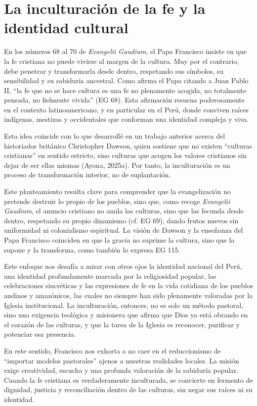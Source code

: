 \documentclass[12pt]{article}
\begin{document}
\section{La inculturación de la fe y la identidad cultural}

En los números 68 al 70 de \textit{Evangelii Gaudium}, el Papa Francisco insiste en que la fe cristiana no puede vivirse al margen de la cultura. Muy por el contrario, debe penetrar y transformarla desde dentro, respetando sus símbolos, su sensibilidad y su sabiduría ancestral. Como afirma el Papa citando a Juan Pablo II, “la fe que no se hace cultura es una fe no plenamente acogida, no totalmente pensada, no fielmente vivida” (EG 68). Esta afirmación resuena poderosamente en el contexto latinoamericano, y en particular en el Perú, donde conviven raíces indígenas, mestizas y occidentales que conforman una identidad compleja y viva.

Esta idea coincide con lo que desarrollé en un trabajo anterior acerca del historiador británico Christopher Dawson, quien sostiene que no existen “culturas cristianas” en sentido estricto, sino culturas que acogen los valores cristianos sin dejar de ser ellas mismas (Ayona, 2025a). Por tanto, la inculturación es un proceso de transformación interior, no de suplantación.

Este planteamiento resulta clave para comprender que la evangelización no pretende destruir lo propio de los pueblos, sino que, como recoge \textit{Evangelii Gaudium}, el anuncio cristiano no anula las culturas, sino que las fecunda desde dentro, respetando su propio dinamismo (cf. EG 69), dando frutos nuevos sin uniformidad ni colonialismo espiritual. La visión de Dawson y la enseñanza del Papa Francisco coinciden en que la gracia no suprime la cultura, sino que la supone y la transforma, como también lo expresa EG 115.

Este enfoque nos desafía a mirar con otros ojos la identidad nacional del Perú, una identidad profundamente marcada por la religiosidad popular, las celebraciones sincréticas y las expresiones de fe en la vida cotidiana de los pueblos andinos y amazónicos, las cuales no siempre han sido plenamente valoradas por la Iglesia institucional. La inculturación, entonces, no es solo un método pastoral, sino una exigencia teológica y misionera que afirma que Dios ya está obrando en el corazón de las culturas, y que la tarea de la Iglesia es reconocer, purificar y potenciar esa presencia.

En este sentido, Francisco nos exhorta a no caer en el reduccionismo de “importar modelos pastorales” ajenos a nuestras realidades locales. La misión exige creatividad, escucha y una profunda valoración de la sabiduría popular. Cuando la fe cristiana es verdaderamente inculturada, se convierte en fermento de dignidad, justicia y reconciliación dentro de las culturas, sin negar sus raíces ni su identidad.
\end{document}
